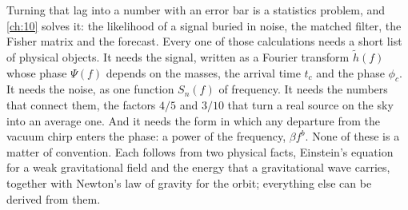 Turning that lag into a number with an error bar is a statistics problem, and \cref{ch:10} solves it: the likelihood of a signal buried in noise, the matched filter, the Fisher matrix and the forecast. Every one of those calculations needs a short list of physical objects. It needs the signal, written as a Fourier transform $\tilde h(f)$ whose phase $\Psi(f)$ depends on the masses, the arrival time $t_c$ and the phase $\phi_c$. It needs the noise, as one function $S_n(f)$ of frequency. It needs the numbers that connect them, the factors $4/5$ and $3/10$ that turn a real source on the sky into an average one. And it needs the form in which any departure from the vacuum chirp enters the phase: a power of the frequency, $\beta f^b$. None of these is a matter of convention. Each follows from two physical facts, Einstein's equation for a weak gravitational field and the energy that a gravitational wave carries, together with Newton's law of gravity for the orbit; everything else can be derived from them.

